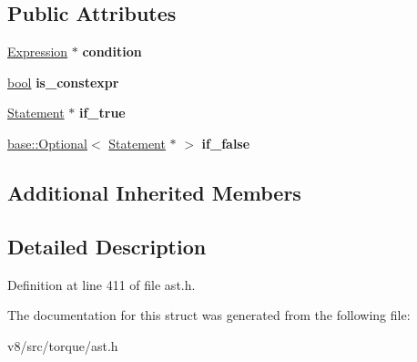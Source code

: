 \subsection*{Public Attributes}
\begin{DoxyCompactItemize}
\item 
\mbox{\label{structv8_1_1internal_1_1torque_1_1IfStatement_a8a2364ec4a16184e177e96eef63801ac}} 
\mbox{\hyperlink{structv8_1_1internal_1_1torque_1_1Expression}{Expression}} $\ast$ {\bfseries condition}
\item 
\mbox{\label{structv8_1_1internal_1_1torque_1_1IfStatement_aa6d5f7bb91d313b2325d44641e79f27f}} 
\mbox{\hyperlink{classbool}{bool}} {\bfseries is\+\_\+constexpr}
\item 
\mbox{\label{structv8_1_1internal_1_1torque_1_1IfStatement_aacb54a5d33d1c6d9152bb3c4534e3168}} 
\mbox{\hyperlink{structv8_1_1internal_1_1torque_1_1Statement}{Statement}} $\ast$ {\bfseries if\+\_\+true}
\item 
\mbox{\label{structv8_1_1internal_1_1torque_1_1IfStatement_a9e42a50e7b6e8a1ab745786cd7bead1a}} 
\mbox{\hyperlink{classv8_1_1base_1_1Optional}{base\+::\+Optional}}$<$ \mbox{\hyperlink{structv8_1_1internal_1_1torque_1_1Statement}{Statement}} $\ast$ $>$ {\bfseries if\+\_\+false}
\end{DoxyCompactItemize}
\subsection*{Additional Inherited Members}


\subsection{Detailed Description}


Definition at line 411 of file ast.\+h.



The documentation for this struct was generated from the following file\+:\begin{DoxyCompactItemize}
\item 
v8/src/torque/ast.\+h\end{DoxyCompactItemize}
